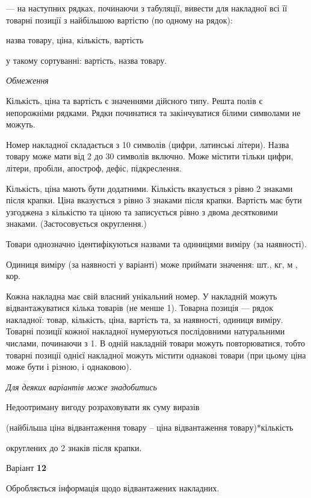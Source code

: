 \documentclass[11pt, ukrainian]{article}
\begin{document}
{\noindent}--- на наступних рядках, починаючи з табуляції, вивести для накладної всі її товарні позиції з найбільшою вартістю (по одному на рядок):\par
назва товару, ціна, кількість, вартість

{\noindent}у такому сортуванні: вартість, назва товару.


\bigskip\textit{Обмеження}

Кількість, ціна та вартість є значеннями дійсного типу.
Решта полів є непорожніми рядками.
Рядки починатися та закінчуватися білими символами не можуть.

Номер накладної складається з 10 символів (цифри, латинські літери).
Назва товару може мати від 2 до 30 символів включно.
Може містити тільки цифри, літери, пробіли, апостроф, дефіс, підкреслення.

Кількість, ціна мають бути додатними.
Кількість вказується з рівно 2 знаками після крапки.
Ціна вказується з рівно 3 знаками після крапки.
Вартість має бути узгоджена з кількістю та ціною та записується рівно з двома десятковими знаками.
(Застосовується округлення.)

Товари однозначно ідентифікуються назвами та одиницями виміру (за наявності).

Одиниця виміру (за наявності у варіанті) може приймати значення: шт., кг, м , кор.

Кожна накладна має свій власний унікальний номер.
У накладній можуть відвантажуватися кілька товарів (не менше 1).
Товарна позиція --- рядок накладної: товар, кількість, ціна, вартість та, за наявності, одиниця виміру.
Товарні позиції кожної накладної нумеруються послідовними натуральними числами, починаючи з 1.
В одній накладній товари можуть повторюватися, 
тобто товарні позиції однієї накладної можуть містити однакові товари 
(при цьому ціна може бути і різною, і однаковою).

\bigskip\textit{Для деяких варіантів може знадобитись}

Недоотриману вигоду розраховувати як суму виразів
{\center (найбільша ціна відвантаження товару – ціна відвантаження товару)*кількість\par}

\bigskip
{\noindent} округлених до 2 знаків після крапки.


\par
\newpage
{\center Варіант  \No \textbf { 12 }\par}
\bigskip
Обробляється інформація щодо відвантажених накладних.
\end{document}
